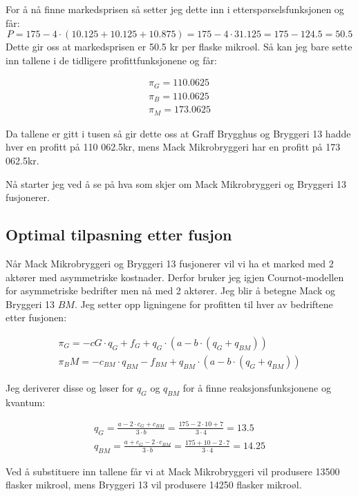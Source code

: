 \documentclass[
  12pt,
  a4paper,
  DIV=11,
  numbers=noendperiod]{scrartcl}
\begin{document}
For å nå finne markedsprisen så setter jeg dette inn i
etterspørselsfunksjonen og får: \[
P = 175 - 4\cdot(10.125 + 10.125 + 10.875) = 175 - 4\cdot 31.125 = 175 - 124.5 = 50.5
\] Dette gir oss at markedsprisen er 50.5 kr per flaske mikroøl. Så kan
jeg bare sette inn tallene i de tidligere profittfunksjonene og får:

\begin{align*}
\pi_G = 110.0625 \\
\pi_B = 110.0625 \\
\pi_M = 173.0625
\end{align*}

Da tallene er gitt i tusen så gir dette oss at Graff Brygghus og
Bryggeri 13 hadde hver en profitt på 110 062.5kr, mens Mack
Mikrobryggeri har en profitt på 173 062.5kr.

Nå starter jeg ved å se på hva som skjer om Mack Mikrobryggeri og
Bryggeri 13 fusjonerer.

\clearpage

\subsection{Optimal tilpasning etter
fusjon}\label{optimal-tilpasning-etter-fusjon}

Når Mack Mikrobryggeri og Bryggeri 13 fusjonerer vil vi ha et marked med
2 aktører med asymmetriske kostnader. Derfor bruker jeg igjen
Cournot-modellen for asymmetriske bedrifter men nå med 2 aktører. Jeg
blir å betegne Mack og Bryggeri 13 \(BM\). Jeg setter opp ligningene for
profitten til hver av bedriftene etter fusjonen:

\begin{align*}
\pi_G = -cG \cdot q_G + f_G + q_G \cdot (a - b \cdot (q_G + q_{BM}))\\
\pi_BM = -c_{BM} \cdot q_{BM} - f_{BM} + q_{BM} \cdot (a - b \cdot (q_G + q_{BM}))
\end{align*}

Jeg deriverer disse og løser for \(q_G\) og \(q_{BM}\) for å finne
reaksjonsfunksjonene og kvantum:

\begin{align*}
q_G = \frac{a-2\cdot c_G + c_{BM}}{3\cdot b} = \frac{175-2\cdot 10 + 7}{3\cdot 4} =  13.5\\
q_{BM} = \frac{a + c_G -2\cdot c_{BM}}{3\cdot b} = \frac{175 + 10 -2\cdot 7}{3\cdot 4} = 14.25
\end{align*}

Ved å substituere inn tallene får vi at Mack Mikrobryggeri vil produsere
13500 flasker mikroøl, mens Bryggeri 13 vil produsere 14250 flasker
mikroøl.
\end{document}
